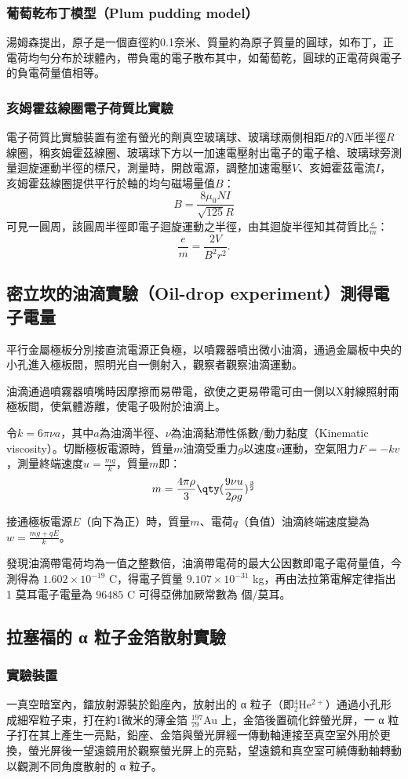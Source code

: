 \documentclass[a4paper,12pt]{report}
\begin{document}
\subsubsection{葡萄乾布丁模型（Plum pudding model）}
湯姆森提出，原子是一個直徑約0.1奈米、質量約為原子質量的圓球，如布丁，正電荷均勻分布於球體內，帶負電的電子散布其中，如葡萄乾，圓球的正電荷與電子的負電荷量值相等。
\subsubsection{亥姆霍茲線圈電子荷質比實驗}
電子荷質比實驗裝置有塗有螢光的劑真空玻璃球、玻璃球兩側相距$R$的$N$匝半徑$R$線圈，稱亥姆霍茲線圈、玻璃球下方以一加速電壓射出電子的電子槍、玻璃球旁測量迴旋運動半徑的標尺，測量時，開啟電源，調整加速電壓$V$、亥姆霍茲電流$I$，亥姆霍茲線圈提供平行於軸的均勻磁場量值$B$：
\[B=\frac{8\mu_0NI}{\sqrt{125}R}\]
可見一圓周，該圓周半徑即電子迴旋運動之半徑，由其迴旋半徑知其荷質比$\frac{e}{m}$：
\[\frac{e}{m}=\frac{2V}{B^2r^2}.\]
\subsection{密立坎的油滴實驗（Oil-drop experiment）測得電子電量}
\bit
\item 平行金屬極板分別接直流電源正負極，以噴霧器噴出微小油滴，通過金屬板中央的小孔進入極板間，照明光自一側射入，觀察者觀察油滴運動。
\item 油滴通過噴霧器噴嘴時因摩擦而易帶電，欲使之更易帶電可由一側以X射線照射兩極板間，使氣體游離，使電子吸附於油滴上。
\item 令$k=6\pi\nu a$，其中$a$為油滴半徑、$\nu$為油滴黏滯性係數/動力黏度（Kinematic viscosity）。切斷極板電源時，質量$m$油滴受重力$g$以速度$v$運動，空氣阻力$F=-kv$，測量終端速度$u=\frac{mg}{k}$，質量$m$即：
\[m=\frac{4\pi\rho}{3}\qty(\frac{9\nu u}{2\rho g})^{\frac{3}{2}}\]
\item 接通極板電源$E$（向下為正）時，質量$m$、電荷$q$（負值）油滴終端速度變為$w=\frac{mg+qE}{k}$。
\item 發現油滴帶電荷均為一值之整數倍，油滴帶電荷的最大公因數即電子電荷量值，今測得為 \(1.602 \times 10^{-19}\) C，得電子質量 \(9.107 \times 10^{-31}\) kg，再由法拉第電解定律指出 1 莫耳電子電量為 $96485$ C 可得亞佛加厥常數為  個/莫耳。
\eit
\subsection{拉塞福的 α 粒子金箔散射實驗}
\subsubsection{實驗裝置}
一真空暗室內，鐳放射源裝於鉛座內，放射出的 α 粒子（即$^4_2$He$^{2+}$）通過小孔形成細窄粒子束，打在約1微米的薄金箔 $^{197}_{79}$Au 上，金箔後置硫化鋅螢光屏，一 α 粒子打在其上產生一亮點，鉛座、金箔與螢光屏經一傳動軸連接至真空室外用於更換，螢光屏後一望遠鏡用於觀察螢光屏上的亮點，望遠鏡和真空室可繞傳動軸轉動以觀測不同角度散射的 α 粒子。
\end{document}
